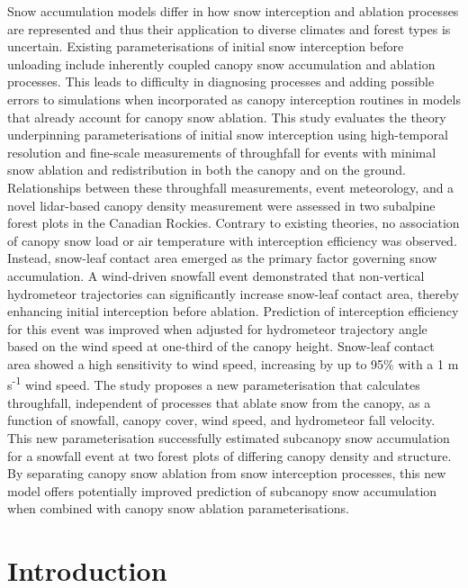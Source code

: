 \documentclass[
  letterpaper,
]{tex/uofsthesis-cs}
\begin{document}
Snow accumulation models differ in how snow interception and ablation
processes are represented and thus their application to diverse climates
and forest types is uncertain. Existing parameterisations of initial
snow interception before unloading include inherently coupled canopy
snow accumulation and ablation processes. This leads to difficulty in
diagnosing processes and adding possible errors to simulations when
incorporated as canopy interception routines in models that already
account for canopy snow ablation. This study evaluates the theory
underpinning parameterisations of initial snow interception using
high-temporal resolution and fine-scale measurements of throughfall for
events with minimal snow ablation and redistribution in both the canopy
and on the ground. Relationships between these throughfall measurements,
event meteorology, and a novel lidar-based canopy density measurement
were assessed in two subalpine forest plots in the Canadian Rockies.
Contrary to existing theories, no association of canopy snow load or air
temperature with interception efficiency was observed. Instead,
snow-leaf contact area emerged as the primary factor governing snow
accumulation. A wind-driven snowfall event demonstrated that
non-vertical hydrometeor trajectories can significantly increase
snow-leaf contact area, thereby enhancing initial interception before
ablation. Prediction of interception efficiency for this event was
improved when adjusted for hydrometeor trajectory angle based on the
wind speed at one-third of the canopy height. Snow-leaf contact area
showed a high sensitivity to wind speed, increasing by up to 95\% with a
1 m s\textsuperscript{-1} wind speed. The study proposes a new
parameterisation that calculates throughfall, independent of processes
that ablate snow from the canopy, as a function of snowfall, canopy
cover, wind speed, and hydrometeor fall velocity. This new
parameterisation successfully estimated subcanopy snow accumulation for
a snowfall event at two forest plots of differing canopy density and
structure. By separating canopy snow ablation from snow interception
processes, this new model offers potentially improved prediction of
subcanopy snow accumulation when combined with canopy snow ablation
parameterisations.

\section{Introduction}\label{introduction-2}
\end{document}

